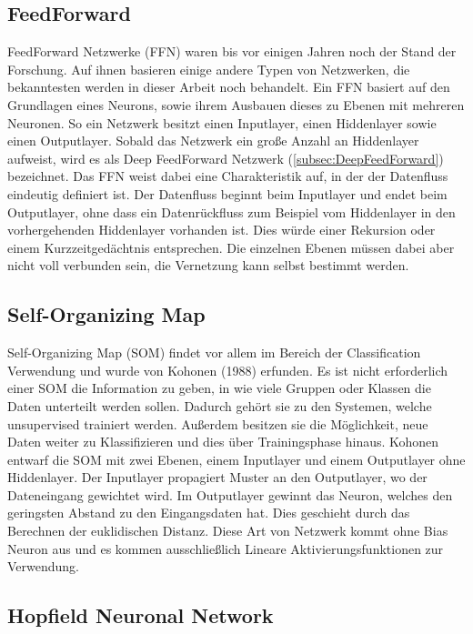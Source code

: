 \subsection{FeedForward}
\label{subsec:FeedForward}

FeedForward Netzwerke (FFN) waren bis vor einigen Jahren noch der Stand der Forschung.
Auf ihnen basieren einige andere Typen von Netzwerken, die bekanntesten werden in dieser Arbeit noch behandelt.
Ein FFN basiert auf den Grundlagen eines Neurons, sowie ihrem Ausbauen dieses zu Ebenen mit mehreren Neuronen.
So ein Netzwerk besitzt einen Inputlayer, einen Hiddenlayer sowie einen Outputlayer.
Sobald das Netzwerk ein große Anzahl an Hiddenlayer aufweist, wird es als Deep FeedForward Netzwerk (\ref{subsec:DeepFeedForward}) bezeichnet.
Das FFN weist dabei eine Charakteristik auf, in der der Datenfluss eindeutig definiert ist. 
Der Datenfluss beginnt beim Inputlayer und endet beim Outputlayer, ohne dass ein Datenrückfluss zum Beispiel vom Hiddenlayer in den vorhergehenden Hiddenlayer vorhanden ist.
Dies würde einer Rekursion oder einem Kurzzeitgedächtnis entsprechen.
Die einzelnen Ebenen müssen dabei aber nicht voll verbunden sein, die Vernetzung kann selbst bestimmt werden.

\subsection{Self-Organizing Map}
\label{subsec:SelfOrganizingMap}

Self-Organizing Map (SOM) findet vor allem im Bereich der Classification Verwendung und wurde von Kohonen (1988) erfunden. 
Es ist nicht erforderlich einer SOM die Information zu geben, in wie viele Gruppen oder Klassen die Daten unterteilt werden sollen. 
Dadurch gehört sie zu den Systemen, welche unsupervised trainiert werden. 
Außerdem besitzen sie die Möglichkeit, neue Daten weiter zu Klassifizieren und dies über Trainingsphase hinaus. 
Kohonen entwarf die SOM mit zwei Ebenen, einem Inputlayer und einem Outputlayer ohne Hiddenlayer. 
Der Inputlayer propagiert Muster an den Outputlayer, wo der Dateneingang gewichtet wird. 
Im Outputlayer gewinnt das Neuron, welches den geringsten Abstand zu den Eingangsdaten hat.
Dies geschieht durch das Berechnen der euklidischen Distanz. 
Diese Art von Netzwerk kommt ohne Bias Neuron aus und es kommen ausschließlich Lineare Aktivierungsfunktionen zur Verwendung.


\subsection{Hopfield Neuronal Network}

